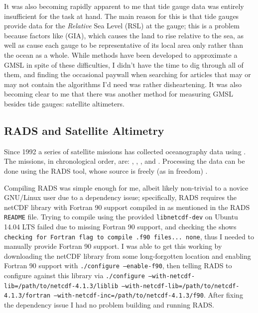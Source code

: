 \documentclass{article}
\begin{document}
It was also becoming rapidly apparent to me that tide gauge data was entirely insufficient for the task at hand.  The main reason for this is that tide gauges provide data for the \emph{Relative} Sea Level (RSL) at the gauge; this is a problem because factors like  (GIA), which causes the land to rise relative to the sea, as well as  cause each gauge to be representative of its local area only rather than the ocean as a whole.  While methods have been developed to approximate a GMSL in spite of these difficulties, I didn't have the time to dig through all of them, and finding the occasional paywall when searching for articles that may or may not contain the algorithms I'd need was rather disheartening.  It was also becoming clear to me that there was another method for measuring GMSL besides tide gauges: satellite altimeters.

\subsection{RADS and Satellite Altimetry}
Since 1992 a series of satellite missions has collected oceanography data using .  The missions, in chronological order, are: , , , and .  Processing the data can be done using the RADS tool, whose source is freely (as in freedom) .

Compiling RADS was simple enough for me, albeit likely non-trivial to a novice GNU/Linux user due to a dependency issue; specifically, RADS requires the netCDF library with Fortran 90 support compiled in as mentioned in the RADS \texttt{README} file.  Trying to compile using the provided \texttt{libnetcdf-dev} on Ubuntu 14.04 LTS failed due to missing Fortran 90 support, and checking the  shows \texttt{checking for Fortran flag to compile .f90 files... none}, thus I needed to manually provide Fortran 90 support.  I was able to get this working by downloading the netCDF library from some long-forgotten location and enabling Fortran 90 support with \texttt{./configure --enable-f90}, then telling RADS to configure against this library via \texttt{./configure --with-netcdf-lib=/path/to/netcdf-4.1.3/liblib --with-netcdf-lib=/path/to/netcdf-4.1.3/fortran --with-netcdf-inc=/path/to/netcdf-4.1.3/f90}.  After fixing the dependency issue I had no problem building and running RADS.
\end{document}
